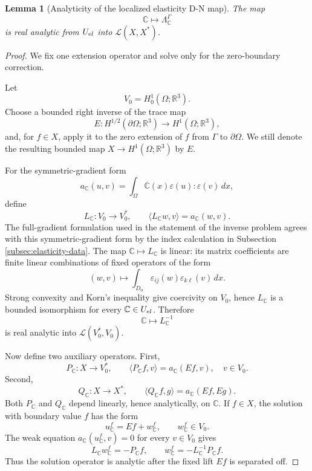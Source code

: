 \documentclass[10pt,a4paper]{amsart}
\newtheorem{lemma}{Lemma}
\newcommand{\R}{\mathbb R}
\newcommand{\cL}{\mathcal L}
\newcommand{\dual}[2]{\langle #1,#2\rangle}
\begin{document}
\begin{lemma}[Analyticity of the localized elasticity D-N map]\label{lem:elastic-analytic}
The map
\[
        \mathbb C\mapsto\Lambda_{\mathbb C}^\Gamma
\]
is real analytic from $U_{\rm el}$ into $\cL(X,X^*)$.
\end{lemma}

\begin{proof}
We fix one extension operator and solve only for the zero-boundary correction.

Let
\[
        V_0=H^1_0(\Omega;\R^3).
\]
Choose a bounded right inverse of the trace map
\[
        E:H^{1/2}(\partial\Omega;\R^3)\to H^1(\Omega;\R^3),
\]
and, for $f\in X$, apply it to the zero extension of $f$ from $\Gamma$ to $\partial\Omega$.  We still denote the resulting bounded map $X\to H^1(\Omega;\R^3)$ by $E$.

For the symmetric-gradient form
\[
        a_{\mathbb C}(u,v)=
        \int_\Omega \mathbb C(x)\varepsilon(u):\varepsilon(v)\,dx,
\]
define
\[
        L_{\mathbb C}:V_0\to V_0^*,
        \qquad
        \dual{L_{\mathbb C}w}{v}=a_{\mathbb C}(w,v).
\]
The full-gradient formulation used in the statement of the inverse problem agrees with this symmetric-gradient form by the index calculation in Subsection \ref{subsec:elasticity-data}.  The map $\mathbb C\mapsto L_{\mathbb C}$ is linear: its matrix coefficients are finite linear combinations of fixed operators of the form
\[
        (w,v)\mapsto
        \int_{D_\alpha}\varepsilon_{ij}(w)\varepsilon_{k\ell}(v)\,dx .
\]
Strong convexity and Korn's inequality give coercivity on $V_0$, hence $L_{\mathbb C}$ is a bounded isomorphism for every $\mathbb C\in U_{\rm el}$.  Therefore
\[
        \mathbb C\mapsto L_{\mathbb C}^{-1}
\]
is real analytic into $\cL(V_0^*,V_0)$.

Now define two auxiliary operators.  First,
\[
        P_{\mathbb C}:X\to V_0^*,
        \qquad
        \dual{P_{\mathbb C}f}{v}=a_{\mathbb C}(Ef,v),
        \quad v\in V_0 .
\]
Second,
\[
        Q_{\mathbb C}:X\to X^*,
        \qquad
        \dual{Q_{\mathbb C}f}{g}=a_{\mathbb C}(Ef,Eg).
\]
Both $P_{\mathbb C}$ and $Q_{\mathbb C}$ depend linearly, hence analytically, on $\mathbb C$.  If $f\in X$, the solution with boundary value $f$ has the form
\[
        u_{\mathbb C}^f=Ef+w_{\mathbb C}^f,
        \qquad w_{\mathbb C}^f\in V_0.
\]
The weak equation $a_{\mathbb C}(u_{\mathbb C}^f,v)=0$ for every $v\in V_0$ gives
\[
        L_{\mathbb C}w_{\mathbb C}^f=-P_{\mathbb C}f,
        \qquad
        w_{\mathbb C}^f=-L_{\mathbb C}^{-1}P_{\mathbb C}f.
\]
Thus the solution operator is analytic after the fixed lift $Ef$ is separated off.


\end{proof}
\end{document}
